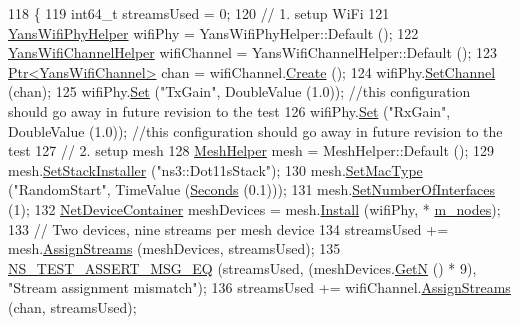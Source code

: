 \begin{DoxyCode}
118 \{
119   int64\_t streamsUsed = 0;
120   \textcolor{comment}{// 1. setup WiFi}
121   \hyperlink{classns3_1_1YansWifiPhyHelper}{YansWifiPhyHelper} wifiPhy = YansWifiPhyHelper::Default ();
122   \hyperlink{classns3_1_1YansWifiChannelHelper}{YansWifiChannelHelper} wifiChannel = YansWifiChannelHelper::Default ();
123   \hyperlink{classns3_1_1Ptr}{Ptr<YansWifiChannel>} chan = wifiChannel.\hyperlink{classns3_1_1YansWifiChannelHelper_a0532e292ab9452f3cf630c848708e563}{Create} ();
124   wifiPhy.\hyperlink{classns3_1_1YansWifiPhyHelper_ad2e9a27587dd4ff320435c93cc2676de}{SetChannel} (chan);
125   wifiPhy.\hyperlink{classns3_1_1WifiPhyHelper_a2527d6d7b29f717fd7436166c5f05f1a}{Set} (\textcolor{stringliteral}{"TxGain"}, DoubleValue (1.0)); \textcolor{comment}{//this configuration should go away in future revision to
       the test}
126   wifiPhy.\hyperlink{classns3_1_1WifiPhyHelper_a2527d6d7b29f717fd7436166c5f05f1a}{Set} (\textcolor{stringliteral}{"RxGain"}, DoubleValue (1.0)); \textcolor{comment}{//this configuration should go away in future revision to
       the test}
127   \textcolor{comment}{// 2. setup mesh}
128   \hyperlink{classns3_1_1MeshHelper}{MeshHelper} mesh = MeshHelper::Default ();
129   mesh.\hyperlink{classns3_1_1MeshHelper_ac1074aff829d0cde1659bdef572880ca}{SetStackInstaller} (\textcolor{stringliteral}{"ns3::Dot11sStack"});
130   mesh.\hyperlink{classns3_1_1MeshHelper_a549d568927a88e95a721f2be58232c10}{SetMacType} (\textcolor{stringliteral}{"RandomStart"}, TimeValue (\hyperlink{group__timecivil_ga33c34b816f8ff6628e33d5c8e9713b9e}{Seconds} (0.1)));
131   mesh.\hyperlink{classns3_1_1MeshHelper_adfc08b62a8d6e835d0fbbac7a349ef5f}{SetNumberOfInterfaces} (1);
132   \hyperlink{classns3_1_1NetDeviceContainer}{NetDeviceContainer} meshDevices = mesh.\hyperlink{classns3_1_1MeshHelper_a7b33f6ca7b6842b3def4479bc7526f2c}{Install} (wifiPhy, *
      \hyperlink{classHwmpSimplestRegressionTest_a09b1242f841e8b9712019309f717523d}{m\_nodes});
133   \textcolor{comment}{// Two devices, nine streams per mesh device}
134   streamsUsed += mesh.\hyperlink{classns3_1_1MeshHelper_a93e9c88a375a86c621a494aafe68882e}{AssignStreams} (meshDevices, streamsUsed);
135   \hyperlink{group__testing_ga2a9d78cffb3db8e867c35fff0b698cf5}{NS\_TEST\_ASSERT\_MSG\_EQ} (streamsUsed, (meshDevices.\hyperlink{classns3_1_1NetDeviceContainer_a74cafc212479bc38976bebd118e856b9}{GetN} () * 9), \textcolor{stringliteral}{"Stream
       assignment mismatch"});
136   streamsUsed += wifiChannel.\hyperlink{classns3_1_1YansWifiChannelHelper_ab409a15cfb8abb5195177625191e2584}{AssignStreams} (chan, streamsUsed);

\end{DoxyCode}

